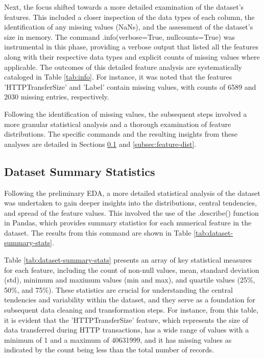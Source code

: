 Next, the focus shifted towards a more detailed examination of the dataset's features. This included a closer inspection of the data types of each column, the identification of any missing values (NaNs), and the assessment of the dataset's size in memory. The command .info(verbose=True, null\textunderscore counts=True) was instrumental in this phase, providing a verbose output that listed all the features along with their respective data types and explicit counts of missing values where applicable. The outcomes of this detailed feature analysis are systematically cataloged in Table \ref{tab:info}. For instance, it was noted that the features 'HTTPTransferSize' and 'Label' contain missing values, with counts of 6589 and 2030 missing entries, respectively.

Following the identification of missing values, the subsequent steps involved a more granular statistical analysis and a thorough examination of feature distributions. The specific commands and the resulting insights from these analyses are detailed in Sections \ref{subsec:ds-summary-statistics} and \ref{subsec:feature-dist}.


\subsection{Dataset Summary Statistics}\label{subsec:ds-summary-statistics} 
Following the preliminary EDA, a more detailed statistical analysis of the dataset was undertaken to gain deeper insights into the distributions, central tendencies, and spread of the feature values. This involved the use of the .describe() function in Pandas, which provides summary statistics for each numerical feature in the dataset. The results from this command are shown in Table \ref{tab:dataset-summary-stats}.

Table \ref{tab:dataset-summary-stats} presents an array of key statistical measures for each feature, including the count of non-null values, mean, standard deviation (std), minimum and maximum values (min and max), and quartile values (25\%, 50\%, and 75\%). These statistics are crucial for understanding the central tendencies and variability within the dataset, and they serve as a foundation for subsequent data cleaning and transformation steps. For instance, from this table, it is evident that the 'HTTPTransferSize' feature, which represents the size of data transferred during HTTP transactions, has a wide range of values with a minimum of 1 and a maximum of 40631999, and it has missing values as indicated by the count being less than the total number of records.


